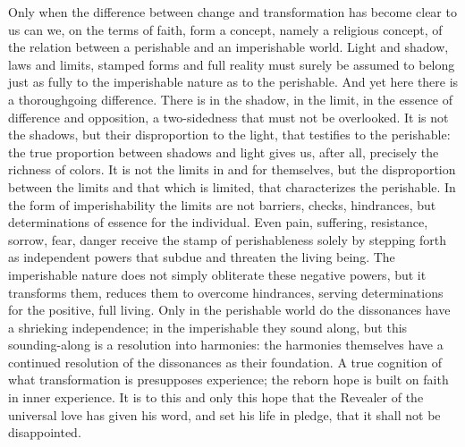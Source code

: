 \documentclass[12pt,a4paper,openany]{book}
\newcommand{\opage}[1]{\marginnote{\footnotesize\textit{[#1]}}}
\begin{document}
\setcounter{footnote}{0}%
\opage{97}Only when the difference between change and transformation has become clear to us can we, on the terms of
faith, form a concept, namely a religious concept, of the relation between a perishable and an imperishable world.
Light and shadow, laws and limits, stamped forms and full reality must surely be assumed to belong just as fully to
the imperishable nature as to the perishable. And yet here there is a thoroughgoing difference. There is in the
shadow, in the limit, in the essence of difference and opposition, a two-sidedness that must not be overlooked. It is
not the shadows, but their disproportion to the light, that testifies to the perishable: the true proportion between
shadows and light gives us, after all, precisely the richness of colors. It is not the limits in and for themselves,
but the disproportion between the limits and that which is limited, that characterizes the perishable. In the form of
imperishability the limits are not barriers, checks, hindrances, but determinations of essence for the individual.
Even pain, suffering, resistance, sorrow, fear, danger receive the stamp of perishableness solely by stepping forth as
independent powers that subdue and threaten the living being. The imperishable nature does not simply obliterate these
negative powers, but it transforms them, reduces them to overcome hindrances, serving determinations for the
positive, full living. Only in the perishable world do the dissonances have a shrieking independence; in the
imperishable they sound along, but this sounding-along is a resolution into harmonies: the harmonies themselves have
a continued resolution of the dissonances as their foundation. A true cognition of what transformation is presupposes
experience; the reborn
\setcounter{footnote}{0}%
\opage{98}hope is built on faith in inner experience. It is to this and only this hope that the Revealer of the
universal love has given his word, and set his life in pledge, that it shall not be disappointed.
\end{document}
